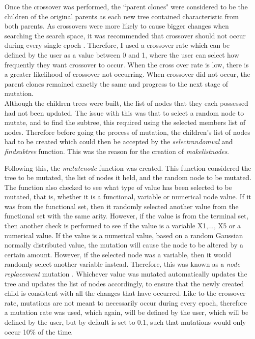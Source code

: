 \documentclass[11pt]{article}
\begin{document}
Once the crossover was performed, the ``parent clones" were considered to be the children of the original parents as each new tree contained characteristic from both parents. As crossovers were more likely to cause bigger changes when searching the search space, it was recommended that crossover should not occur during every single epoch \cite{ref-book}. Therefore, I used a crossover rate which can be defined by the user as a value between 0 and 1, where the user can select how frequently they want crossover to occur. When the cross over rate is low, there is a greater likelihood of crossover not occurring. When crossover did not occur, the parent clones remained exactly the same and progress to the next stage of mutation. \\

Although the children trees were built, the list of nodes that they each possessed had not been updated. The issue with this was that to select a random node to mutate, and to find the subtree, this required using the selected members list of nodes. Therefore before going the process of mutation, the children's list of nodes had to be created which could then be accepted by the \textit{select\textunderscore random\textunderscore val} and \textit{find\textunderscore subtree} function. This was the reason for the creation of \textit{make\textunderscore list\textunderscore nodes}. 

Following this, the \textit{mutate\textunderscore node} function was created. This function considered the tree to be mutated, the list of nodes it held, and the random node to be mutated. The function also checked to see what type of value has been selected to be mutated, that is, whether it is a functional, variable or numerical node value. If it was from the functional set, then it randomly selected another value from the functional set with the same arity. However, if the value is from the terminal set, then another check is performed to see if the value is a variable X1,..., X5 or a numerical value. If the value is a numerical value, based on a random Gaussian normally distributed value, the mutation will cause the node to be altered by a certain amount. However, if the selected node was a variable, then it would randomly select another variable instead. Therefore, this was known as a \textit{node replacement} mutation \cite{ref-book}. Whichever value was mutated automatically updates the tree and updates the list of nodes accordingly, to ensure that the newly created child is consistent with all the changes that have occurred. Like to the crossover rate, mutations are not meant to necessarily occur during every epoch, therefore a mutation rate was used, which again, will be defined by the user, which will be defined by the user, but by default is set to 0.1, such that mutations would only occur 10\% of the time.
\end{document}
